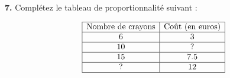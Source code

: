 \documentclass{article}
\begin{document}
\begin{tcolorbox}[colback=yellow!10!white, colframe=yellow!75!black, title=\textcolor{white}{\textbf{Exercices}}, sharp corners=south, boxrule=0.8mm]
    \vspace{10pt}
    
    \textbf{7.} Complétez le tableau de proportionnalité suivant :
    
    \[
    \begin{array}{|c|c|}
    \hline
    \text{Nombre de crayons} & \text{Coût (en euros)} \\
    \hline
    6 & 3 \\
    \hline
    10 & ? \\
    \hline
    15 & 7.5 \\
    \hline
    ? & 12 \\
    \hline
    \end{array}
    \]
    \end{tcolorbox}
    
    \vspace{20pt}
\end{document}
